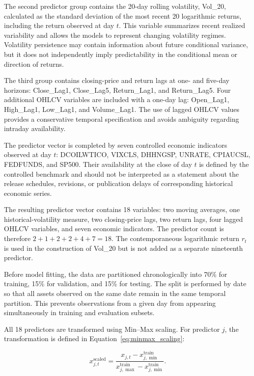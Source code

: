 \documentclass[utf8]{FrontiersinHarvard} %
\begin{document}
The second predictor group contains the 20-day rolling volatility, Vol\_20, calculated as the standard deviation of the most recent 20 logarithmic returns, including the return observed at day \(t\). This variable summarizes recent realized variability and allows the models to represent changing volatility regimes. Volatility persistence may contain information about future conditional variance, but it does not independently imply predictability in the conditional mean or direction of returns.

The third group contains closing-price and return lags at one- and five-day horizons: Close\_Lag1, Close\_Lag5, Return\_Lag1, and Return\_Lag5. Four additional OHLCV variables are included with a one-day lag: Open\_Lag1, High\_Lag1, Low\_Lag1, and Volume\_Lag1. The use of lagged OHLCV values provides a conservative temporal specification and avoids ambiguity regarding intraday availability.

The predictor vector is completed by seven controlled economic indicators observed at day \(t\): DCOILWTICO, VIXCLS, DHHNGSP, UNRATE, CPIAUCSL, FEDFUNDS, and SP500. Their availability at the close of day \(t\) is defined by the controlled benchmark and should not be interpreted as a statement about the release schedules, revisions, or publication delays of corresponding historical economic series.

The resulting predictor vector contains 18 variables: two moving averages, one historical-volatility measure, two closing-price lags, two return lags, four lagged OHLCV variables, and seven economic indicators. The predictor count is therefore \(2+1+2+2+4+7=18\). The contemporaneous logarithmic return \(r_t\) is used in the construction of Vol\_20 but is not added as a separate nineteenth predictor.

Before model fitting, the data are partitioned chronologically into 70\% for training, 15\% for validation, and 15\% for testing. The split is performed by date so that all assets observed on the same date remain in the same temporal partition. This prevents observations from a given day from appearing simultaneously in training and evaluation subsets.

All 18 predictors are transformed using Min--Max scaling. For predictor \(j\), the transformation is defined in Equation~\ref{eq:minmax_scaling}:

\begin{equation}
	x^{\mathrm{scaled}}_{j,t}
	=
	\frac{
		x_{j,t}-x^{\mathrm{train}}_{j,\min}
	}{
		x^{\mathrm{train}}_{j,\max}
		-
		x^{\mathrm{train}}_{j,\min}
	}.
	\label{eq:minmax_scaling}
\end{equation}
\end{document}
